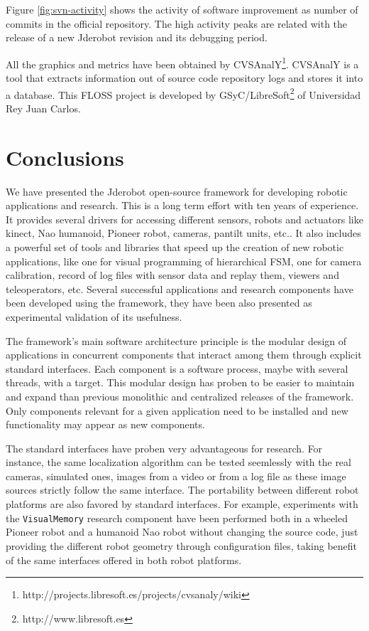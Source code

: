 \documentclass[twocolumn]{svjour3}          %
\begin{document}
Figure \ref{fig:svn-activity} shows the activity of software
improvement as number of commits in the official repository. The high
activity peaks are related with the release of a new Jderobot revision
and its debugging period.

All the graphics and metrics have been obtained by
CVSAnalY\footnote{http://projects.libresoft.es/projects/cvsanaly/wiki
}. CVSAnalY is a tool that extracts information out of
source code repository logs and stores it into a database. This FLOSS
project is developed by
GSyC/LibreSoft\footnote{http://www.libresoft.es}
 of Universidad Rey Juan Carlos.


\section{Conclusions}

We have presented the Jderobot open-source framework for developing robotic applications and research. This is a long term effort with ten years of experience. It provides several drivers for accessing different sensors, robots and actuators like kinect, Nao humanoid, Pioneer robot, cameras, pantilt units, etc.. It also includes a powerful set of tools and libraries that speed up the creation of new robotic applications, like one for visual programming of hierarchical FSM, one for camera calibration, record of log files with sensor data and replay them, viewers and teleoperators, etc. Several successful applications and research components have been developed using the framework, they have been also presented as experimental validation of its usefulness.

The framework's main software architecture principle is the modular design of applications in concurrent components that interact among them through explicit standard interfaces. Each component is a software process, maybe with several threads, with a target. This modular design has proben to be easier to maintain and expand than previous monolithic and centralized releases of the framework. Only components relevant for a given application need to be installed and new functionality may appear as new components.

The standard interfaces have proben very advantageous for research. For instance, the same localization algorithm can be tested seemlessly with the real cameras, simulated ones, images from a video or from a log file as these image sources strictly follow the same interface. The portability between different robot platforms are also favored by standard interfaces. For example, experiments with the \texttt{VisualMemory} research component have been performed both in a wheeled Pioneer robot and a humanoid Nao robot without changing the source code, just providing the different robot geometry through configuration files, taking benefit of the same interfaces offered in both robot platforms.
\end{document}
